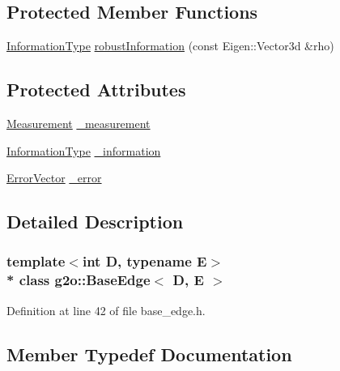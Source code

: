 \subsection*{Protected Member Functions}
\begin{DoxyCompactItemize}
\item 
\hyperlink{classg2o_1_1BaseEdge_a2e5a33343ac3f189d8a7d5ee4d8b73fc}{Information\+Type} \hyperlink{classg2o_1_1BaseEdge_a069937ed6fadf557368cd0fce7ab2f59}{robust\+Information} (const Eigen\+::\+Vector3d \&rho)
\end{DoxyCompactItemize}
\subsection*{Protected Attributes}
\begin{DoxyCompactItemize}
\item 
\hyperlink{classg2o_1_1BaseEdge_a2c148abba650a20b8c7eed75d3e2211e}{Measurement} \hyperlink{classg2o_1_1BaseEdge_af2a6ab1df6e91601b4cab23e0e99e034}{\+\_\+measurement}
\item 
\hyperlink{classg2o_1_1BaseEdge_a2e5a33343ac3f189d8a7d5ee4d8b73fc}{Information\+Type} \hyperlink{classg2o_1_1BaseEdge_a49f11e3d1eaa8e666e1d4d3607279377}{\+\_\+information}
\item 
\hyperlink{classg2o_1_1BaseEdge_af5b558dd24e4be2e437563cae4b3550d}{Error\+Vector} \hyperlink{classg2o_1_1BaseEdge_af31f4b0a67bb12b4de4a32dc42467836}{\+\_\+error}
\end{DoxyCompactItemize}


\subsection{Detailed Description}
\subsubsection*{template$<$int D, typename E$>$\\*
class g2o\+::\+Base\+Edge$<$ D, E $>$}



Definition at line 42 of file base\+\_\+edge.\+h.



\subsection{Member Typedef Documentation}
